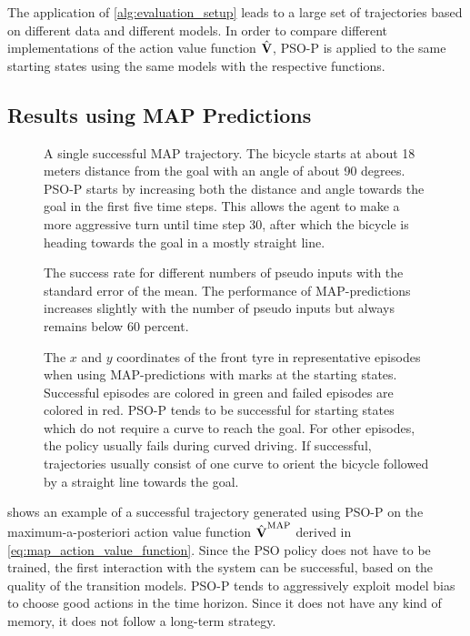 The application of \cref{alg:evaluation_setup} leads to a large set of trajectories based on different data and different models.
In order to compare different implementations of the action value function $\operatorname{\hat{\operatorname{\mathbf{V}}}}$, PSO-P is applied to the same starting states using the same models with the respective functions.

\subsection{Results using MAP Predictions}
\begin{figure}[tp]
    \centering
    \caption[Successful MAP trajectory]{
        A single successful MAP trajectory.
        The bicycle starts at about 18 meters distance from the goal with an angle of about 90 degrees.
        PSO-P starts by increasing both the distance and angle towards the goal in the first five time steps.
        This allows the agent to make a more aggressive turn until time step 30, after which the bicycle is heading towards the goal in a mostly straight line.
    }
    \label{fig:map_successful_trajectory}
\end{figure}
\begin{figure}[tp]
    \centering
    \caption[Results using MAP-predictions]{
        The success rate for different numbers of pseudo inputs with the standard error of the mean.
        The performance of MAP-predictions increases slightly with the number of pseudo inputs but always remains below 60 percent.
    }
    \label{fig:map_results}
\end{figure}
\begin{figure}[p]
    \centering
    \caption[Episodes using MAP-predictions]{
        The $x$ and $y$ coordinates of the front tyre in representative episodes when using MAP-predictions with marks at the starting states.
        Successful episodes are colored in green and failed episodes are colored in red.
        PSO-P tends to be successful for starting states which do not require a curve to reach the goal.
        For other episodes, the policy usually fails during curved driving.
        If successful, trajectories usually consist of one curve to orient the bicycle followed by a straight line towards the goal.
    }
    \label{fig:map_trajectories}
\end{figure}
 shows an example of a successful trajectory generated using PSO-P on the maximum-a-posteriori action value function $\operatorname{\hat{\operatorname{\mathbf{V}}}}^{\text{MAP}}$ derived in \cref{eq:map_action_value_function}.
Since the PSO policy does not have to be trained, the first interaction with the system can be successful, based on the quality of the transition models.
PSO-P tends to aggressively exploit model bias to choose good actions in the time horizon.
Since it does not have any kind of memory, it does not follow a long-term strategy.

